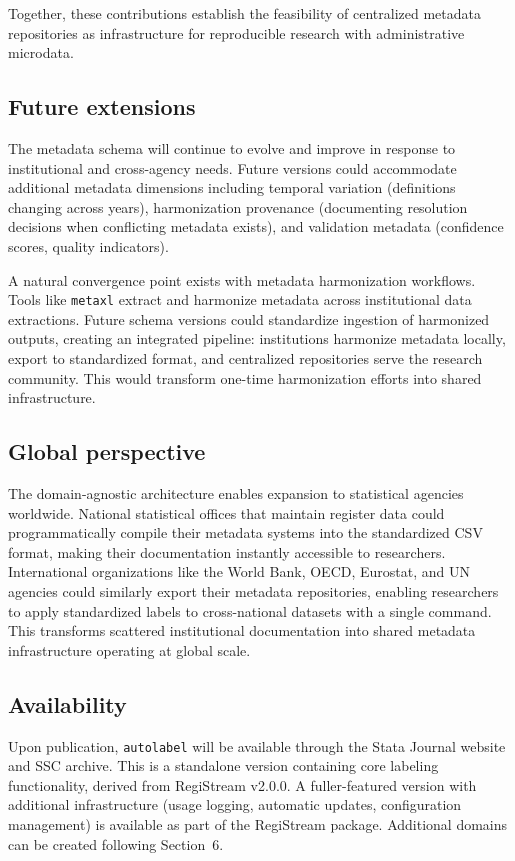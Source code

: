 Together, these contributions establish the feasibility of centralized metadata repositories as infrastructure for reproducible research with administrative microdata.

\subsection{Future extensions}

The metadata schema will continue to evolve and improve in response to institutional and cross-agency needs. Future versions could accommodate additional metadata dimensions including temporal variation (definitions changing across years), harmonization provenance (documenting resolution decisions when conflicting metadata exists), and validation metadata (confidence scores, quality indicators).

A natural convergence point exists with metadata harmonization workflows. Tools like \texttt{metaxl} extract and harmonize metadata across institutional data extractions. Future schema versions could standardize ingestion of harmonized outputs, creating an integrated pipeline: institutions harmonize metadata locally, export to standardized format, and centralized repositories serve the research community. This would transform one-time harmonization efforts into shared infrastructure.

\subsection{Global perspective}

The domain-agnostic architecture enables expansion to statistical agencies worldwide. National statistical offices that maintain register data could programmatically compile their metadata systems into the standardized CSV format, making their documentation instantly accessible to researchers. International organizations like the World Bank, OECD, Eurostat, and UN agencies could similarly export their metadata repositories, enabling researchers to apply standardized labels to cross-national datasets with a single command. This transforms scattered institutional documentation into shared metadata infrastructure operating at global scale.

\subsection*{Availability}

Upon publication, \texttt{autolabel} will be available through the Stata Journal website and SSC archive. This is a standalone version containing core labeling functionality, derived from RegiStream v2.0.0. A fuller-featured version with additional infrastructure (usage logging, automatic updates, configuration management) is available as part of the RegiStream package. Additional domains can be created following Section~6.
